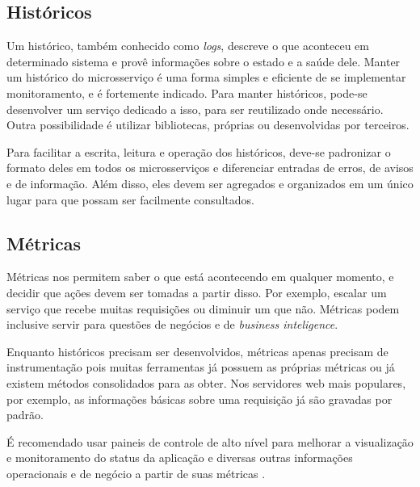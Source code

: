 \subsection{Históricos}

Um histórico, também conhecido como \emph{logs}, descreve o que aconteceu em determinado sistema e provê informações sobre o estado e a saúde dele. Manter um histórico do microsserviço é uma forma simples e eficiente de se implementar monitoramento, e é fortemente indicado. Para manter históricos, pode-se desenvolver um serviço dedicado a isso, para ser reutilizado onde necessário. Outra possibilidade é utilizar bibliotecas, próprias ou desenvolvidas por terceiros.

Para facilitar a escrita, leitura e operação dos históricos, deve-se padronizar o formato deles em todos os microsserviços e diferenciar entradas de erros, de avisos e de informação. Além disso, eles devem ser agregados e organizados em um único lugar para que possam ser facilmente consultados.




\subsection{Métricas}
Métricas nos permitem saber o que está acontecendo em qualquer momento, e decidir que ações devem ser tomadas a partir disso. Por exemplo, escalar um serviço que recebe muitas requisições ou diminuir um que não. Métricas podem inclusive servir para questões de negócios e de \emph{business inteligence}. 

Enquanto históricos precisam ser desenvolvidos, métricas apenas precisam de instrumentação pois muitas ferramentas já possuem as próprias métricas ou já existem métodos consolidados para as obter. Nos servidores web mais populares, por exemplo, as informações básicas sobre uma requisição já são gravadas por padrão.

É recomendado usar paineis de controle de alto nível para melhorar a visualização e monitoramento do status da aplicação e diversas outras informações operacionais e de negócio a partir de suas métricas \cite{martin-fowler-microservices}.

